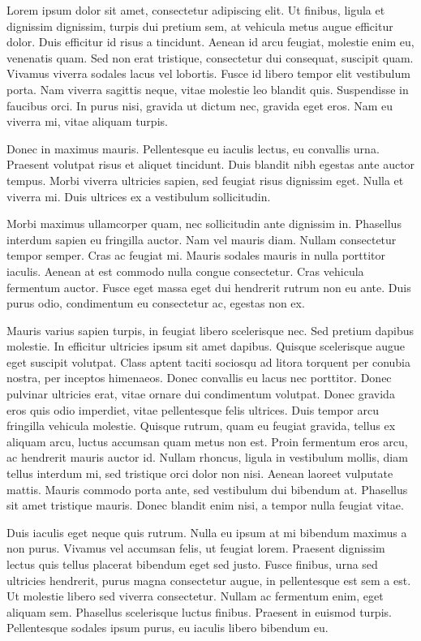 \documentclass[12pt]{article}
\begin{document}
Lorem ipsum dolor sit amet, consectetur adipiscing elit. Ut finibus, ligula et dignissim dignissim, turpis dui pretium sem, at vehicula metus augue efficitur dolor. Duis efficitur id risus a tincidunt. Aenean id arcu feugiat, molestie enim eu, venenatis quam. Sed non erat tristique, consectetur dui consequat, suscipit quam. Vivamus viverra sodales lacus vel lobortis. Fusce id libero tempor elit vestibulum porta. Nam viverra sagittis neque, vitae molestie leo blandit quis. Suspendisse in faucibus orci. In purus nisi, gravida ut dictum nec, gravida eget eros. Nam eu viverra mi, vitae aliquam turpis.

Donec in maximus mauris. Pellentesque eu iaculis lectus, eu convallis urna. Praesent volutpat risus et aliquet tincidunt. Duis blandit nibh egestas ante auctor tempus. Morbi viverra ultricies sapien, sed feugiat risus dignissim eget. Nulla et viverra mi. Duis ultrices ex a vestibulum sollicitudin.

Morbi maximus ullamcorper quam, nec sollicitudin ante dignissim in. Phasellus interdum sapien eu fringilla auctor. Nam vel mauris diam. Nullam consectetur tempor semper. Cras ac feugiat mi. Mauris sodales mauris in nulla porttitor iaculis. Aenean at est commodo nulla congue consectetur. Cras vehicula fermentum auctor. Fusce eget massa eget dui hendrerit rutrum non eu ante. Duis purus odio, condimentum eu consectetur ac, egestas non ex.

Mauris varius sapien turpis, in feugiat libero scelerisque nec. Sed pretium dapibus molestie. In efficitur ultricies ipsum sit amet dapibus. Quisque scelerisque augue eget suscipit volutpat. Class aptent taciti sociosqu ad litora torquent per conubia nostra, per inceptos himenaeos. Donec convallis eu lacus nec porttitor. Donec pulvinar ultricies erat, vitae ornare dui condimentum volutpat. Donec gravida eros quis odio imperdiet, vitae pellentesque felis ultrices. Duis tempor arcu fringilla vehicula molestie. Quisque rutrum, quam eu feugiat gravida, tellus ex aliquam arcu, luctus accumsan quam metus non est. Proin fermentum eros arcu, ac hendrerit mauris auctor id. Nullam rhoncus, ligula in vestibulum mollis, diam tellus interdum mi, sed tristique orci dolor non nisi. Aenean laoreet vulputate mattis. Mauris commodo porta ante, sed vestibulum dui bibendum at. Phasellus sit amet tristique mauris. Donec blandit enim nisi, a tempor nulla feugiat vitae.

Duis iaculis eget neque quis rutrum. Nulla eu ipsum at mi bibendum maximus a non purus. Vivamus vel accumsan felis, ut feugiat lorem. Praesent dignissim lectus quis tellus placerat bibendum eget sed justo. Fusce finibus, urna sed ultricies hendrerit, purus magna consectetur augue, in pellentesque est sem a est. Ut molestie libero sed viverra consectetur. Nullam ac fermentum enim, eget aliquam sem. Phasellus scelerisque luctus finibus. Praesent in euismod turpis. Pellentesque sodales ipsum purus, eu iaculis libero bibendum eu.
\end{document}
